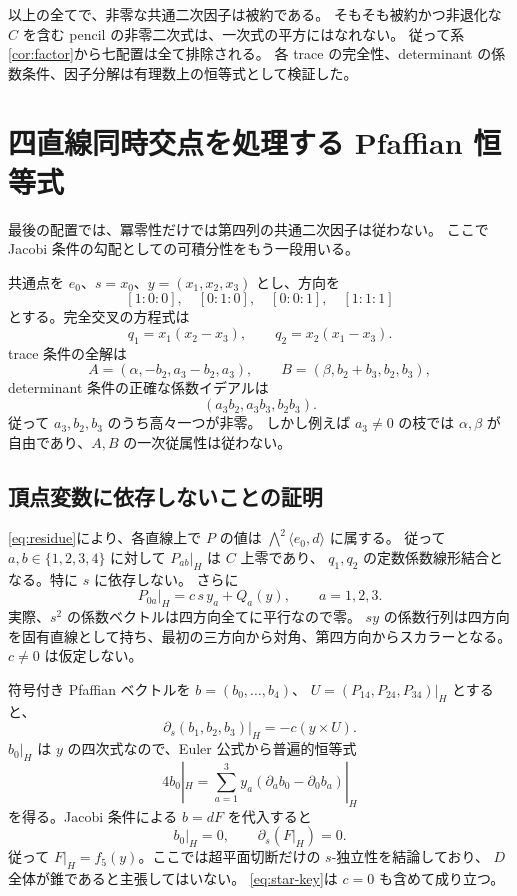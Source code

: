 \documentclass[11pt,a4paper]{ltjsarticle}
\theoremstyle{remark}\newtheorem{remark}[theorem]{注意}
\begin{document}
以上の全てで、非零な共通二次因子は被約である。
そもそも被約かつ非退化な $C$ を含む pencil の非零二次式は、一次式の平方にはなれない。
従って系\ref{cor:factor}から七配置は全て排除される。
各 trace の完全性、determinant の係数条件、因子分解は有理数上の恒等式として検証した。



\section{四直線同時交点を処理する Pfaffian 恒等式}\label{sec:star}

最後の配置では、冪零性だけでは第四列の共通二次因子は従わない。
ここで Jacobi 条件の勾配としての可積分性をもう一段用いる。

共通点を $e_0$、$s=x_0$、$y=(x_1,x_2,x_3)$ とし、方向を
\[
[1:0:0],\quad[0:1:0],\quad[0:0:1],\quad[1:1:1]
\]
とする。完全交叉の方程式は
\[
q_1=x_1(x_2-x_3),\qquad q_2=x_2(x_1-x_3).
\]
trace 条件の全解は
\[
A=(\alpha,-b_2,a_3-b_2,a_3),\qquad B=(\beta,b_2+b_3,b_2,b_3),
\]
determinant 条件の正確な係数イデアルは
\begin{equation}\label{eq:star-det}
(a_3b_2,a_3b_3,b_2b_3).
\end{equation}
従って $a_3,b_2,b_3$ のうち高々一つが非零。
しかし例えば $a_3\ne0$ の枝では $\alpha,\beta$ が自由であり、$A,B$ の一次従属性は従わない。

\subsection{頂点変数に依存しないことの証明}

\eqref{eq:residue}により、各直線上で $P$ の値は
$\bigwedge^2\langle e_0,d\rangle$ に属する。
従って $a,b\in\{1,2,3,4\}$ に対して $P_{ab}|_H$ は $C$ 上零であり、
$q_1,q_2$ の定数係数線形結合となる。特に $s$ に依存しない。
さらに
\begin{equation}\label{eq:scalar-tangency}
P_{0a}|_H=c\,s\,y_a+Q_a(y),\qquad a=1,2,3.
\end{equation}
実際、$s^2$ の係数ベクトルは四方向全てに平行なので零。
$sy$ の係数行列は四方向を固有直線として持ち、最初の三方向から対角、第四方向からスカラーとなる。
$c\ne0$ は仮定しない。

符号付き Pfaffian ベクトルを $b=(b_0,\ldots,b_4)$、
$U=(P_{14},P_{24},P_{34})|_H$ とすると、
\[
\partial_s(b_1,b_2,b_3)|_H=-c(y\times U).
\]
$b_0|_H$ は $y$ の四次式なので、Euler 公式から普遍的恒等式
\begin{equation}\label{eq:star-key}
\boxed{\displaystyle
4b_0|_H=\sum_{a=1}^3 y_a(\partial_a b_0-\partial_0 b_a)|_H}
\end{equation}
を得る。Jacobi 条件による $b=dF$ を代入すると
\[
b_0|_H=0,\qquad \partial_s(F|_H)=0.
\]
従って $F|_H=f_5(y)$。ここでは超平面切断だけの $s$-独立性を結論しており、
$D$ 全体が錐であると主張してはいない。
\eqref{eq:star-key}は $c=0$ も含めて成り立つ。
\end{document}
